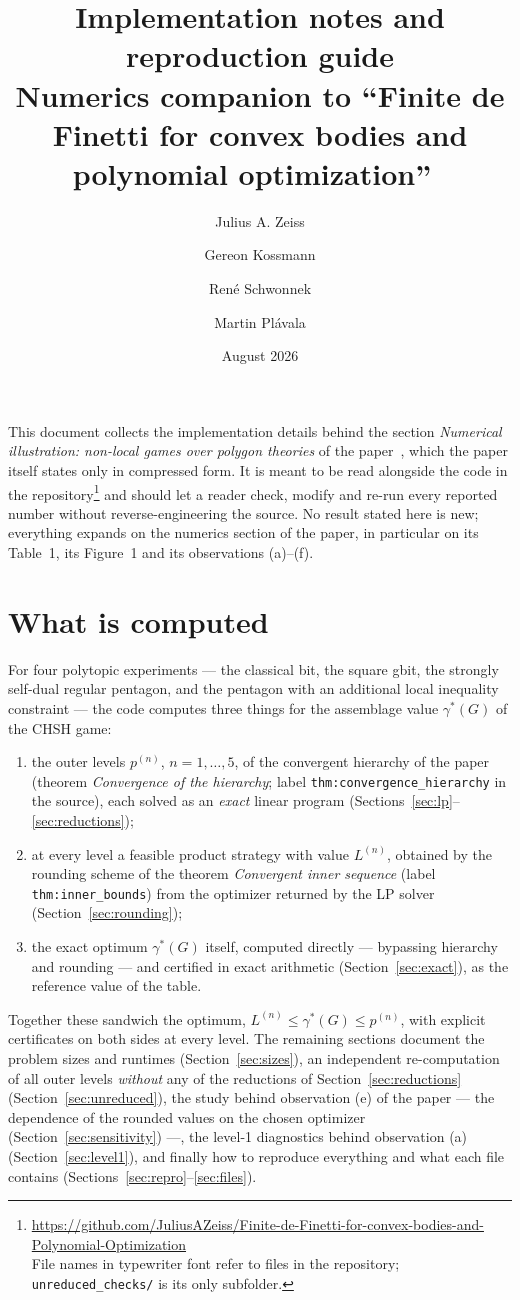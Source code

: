 \documentclass[11pt,a4paper]{article}
\title{Implementation notes and reproduction guide\\[2mm]
{\large Numerics companion to
``Finite de Finetti for convex bodies and polynomial optimization''~\cite{paper}}}
\author{Julius A. Zeiss \and Gereon Kossmann \and Ren\'e Schwonnek \and Martin Pl\'avala}
\date{August 2026}
\newcommand*{\repourl}{\url{https://github.com/JuliusAZeiss/Finite-de-Finetti-for-convex-bodies-and-Polynomial-Optimization}}
\newcommand*{\code}[1]{\texttt{#1}}
\theoremstyle{remark}
\begin{document}
\maketitle

\noindent
This document collects the implementation details behind the section
\emph{Numerical illustration: non-local games over polygon theories} of the
paper~\cite{paper}, which the paper itself states only in compressed form.
It is meant to be read alongside the code in the
repository\footnote{\repourl\\ File names in typewriter font refer to
files in the repository; \code{unreduced\_checks/} is its only subfolder.}
and should let a reader check, modify and re-run every reported number
without reverse-engineering the source. No result stated here is new;
everything expands on the numerics section of the paper, in particular on
its Table~1, its Figure~1 and its observations (a)--(f).

\tableofcontents

\section{What is computed}\label{sec:overview}

For four polytopic experiments --- the classical bit, the square gbit, the
strongly self-dual regular pentagon, and the pentagon with an additional
local inequality constraint --- the code computes three things for the
assemblage value $\gamma^*(G)$ of the CHSH game:
\begin{enumerate}[leftmargin=2em]
\item the outer levels $p^{(n)}$, $n=1,\ldots,5$, of the convergent
hierarchy of the paper (theorem \emph{Convergence of the hierarchy}; label
\code{thm:convergence\_hierarchy} in the source), each solved as an
\emph{exact} linear program (Sections~\ref{sec:lp}--\ref{sec:reductions});
\item at every level a feasible product strategy with value $L^{(n)}$,
obtained by the rounding scheme of the theorem \emph{Convergent inner
sequence} (label \code{thm:inner\_bounds}) from the optimizer returned by
the LP solver (Section~\ref{sec:rounding});
\item the exact optimum $\gamma^*(G)$ itself, computed directly --- bypassing
hierarchy and rounding --- and certified in exact arithmetic
(Section~\ref{sec:exact}), as the reference value of the table.
\end{enumerate}
Together these sandwich the optimum, $L^{(n)}\leq\gamma^*(G)\leq p^{(n)}$,
with explicit certificates on both sides at every level. The remaining
sections document the problem sizes and runtimes (Section~\ref{sec:sizes}),
an independent re-computation of all outer levels \emph{without} any of the
reductions of Section~\ref{sec:reductions} (Section~\ref{sec:unreduced}),
the study behind observation (e) of the paper --- the dependence of the
rounded values on the chosen optimizer (Section~\ref{sec:sensitivity}) ---,
the level-1 diagnostics behind observation (a) (Section~\ref{sec:level1}),
and finally how to reproduce everything and what each file contains
(Sections~\ref{sec:repro}--\ref{sec:files}).
\end{document}
